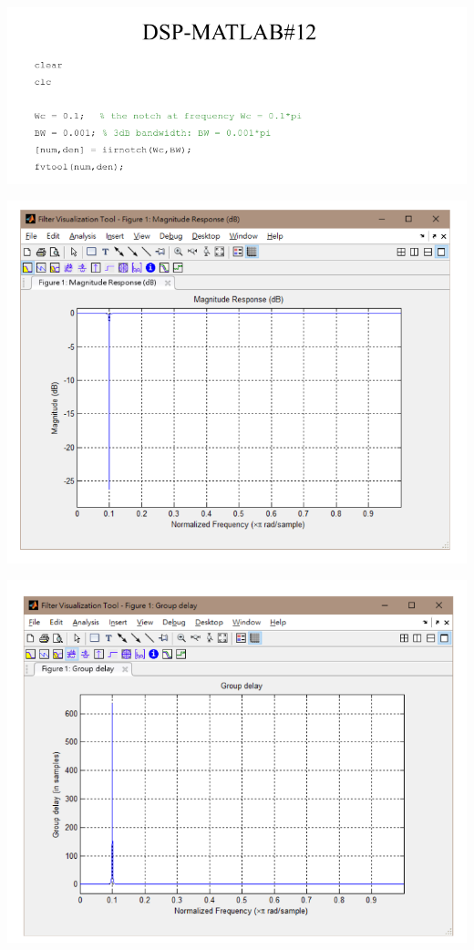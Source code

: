 \documentclass[a4paper]{article}
\begin{document}
	\begin{center}
		\includegraphics[width=0.71\linewidth]{screenshot120}
	\end{center}
	\begin{center}
		\includegraphics[width=1\linewidth]{screenshot121}
	\end{center}
	\begin{center}
		\includegraphics[width=1\linewidth]{screenshot122}
	\end{center}
	
\end{document}
